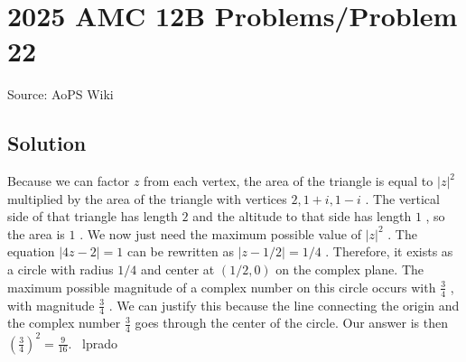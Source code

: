 \documentclass[12pt]{article}
\begin{document}
\section*{{2025 AMC 12B Problems/Problem 22}}
Source: AoPS Wiki

\subsection*{Solution}
Because we can factor $z$ from each vertex, the area of the triangle is equal to $|z|^2$ multiplied by the area of the triangle with vertices $2, 1+i, 1-i$ . The vertical side of that triangle has length $2$ and the altitude to that side has length $1$ , so the area is $1$ . We now just need the maximum possible value of $|z|^2$ . The equation $|4z-2| = 1$ can be rewritten as $|z-1/2| = 1/4$ . Therefore, it exists as a circle with radius $1/4$ and center at $(1/2, 0)$ on the complex plane. The maximum possible magnitude of a complex number on this circle occurs with $\frac{3}{4}$ , with magnitude $\frac{3}{4}$ . We can justify this because the line connecting the origin and the complex number $\frac{3}{4}$ goes through the center of the circle. Our answer is then $\left(\frac{3}{4}\right)^2 = \boxed{\frac{9}{16}}.$ ~lprado
\end{document}
